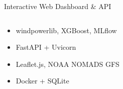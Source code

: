 \documentclass[aspectratio=169,10pt]{beamer}
\begin{document}
\begin{frame}{Interactive Web Dashboard \& API}
\begin{columns}[T]
      \vspace{6pt}
      \begin{tcolorbox}[greenbox, title={\faCogs\; Tech Stack}]
        \begin{itemize}[leftmargin=1em, itemsep=2pt, font=\scriptsize]
          \item windpowerlib, XGBoost, MLflow
          \item FastAPI + Uvicorn
          \item Leaflet.js, NOAA NOMADS GFS
          \item Docker + SQLite
        \end{itemize}
      \end{tcolorbox}
  \end{columns}
\end{frame}

\end{document}
